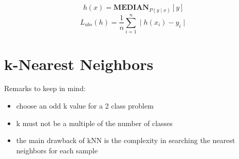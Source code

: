 \documentclass{article}
\begin{document}
\begin{enumerate}
            \begin{equation}
                h(x) = \textbf{MEDIAN}_{P(y\mid x)}[y]
            \end{equation}
            \begin{equation}
                L_{abs}(h) = \frac{1}{n} \sum_{i=1}^{n} \mid h(x_i)-y_{i} \mid
            \end{equation}
    \end{enumerate}
    
\section{k-Nearest Neighbors}
    Remarks to keep in mind:
    \begin{itemize}
        \item 
            choose an odd k value for a 2 class problem
            
        \item
            k must not be a multiple of the number of classes
            
        \item
            the main drawback of kNN is the complexity in searching the nearest neighbors for each sample
    \end{itemize} \\
    
    
        
    
    
\end{document}
